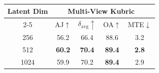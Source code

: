 \begin{tabular}{c cccc}
\toprule
\multirow{2}{*}{Latent Dim }
  & \multicolumn{4}{c}{Multi-View Kubric~\cite{rajic2025mvtracker}} \\
\cmidrule(lr){2-5}
  & AJ$\uparrow$ & $\delta_\text{avg}\uparrow$ & OA$\uparrow$ & MTE$\downarrow$ \\
\midrule
\rowcolor{rowgray}
256 & 56.2 & 66.4 & 88.6 & 3.2 \\
512 & \textbf{60.2} & \textbf{70.4} & \textbf{89.4} & \textbf{2.8} \\
\rowcolor{rowgray}
1024 & 59.9 & 70.2 & \textbf{89.4} & 2.9 \\
\bottomrule
\end{tabular}
